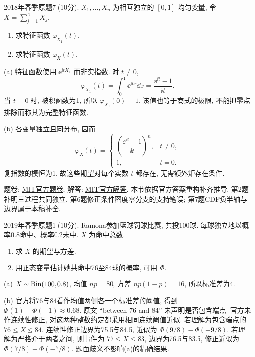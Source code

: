 \begin{exercise}\label{m2:2018s:q7}
2018年春季原题7 (10分). $X_1,\ldots,X_n$ 为相互独立的 $[0,1]$ 均匀变量, 令 $X=\sum_{j=1}^nX_j$.
\begin{enumerate}
\item[(a)]\label{m2:2018s:q7:a} 求特征函数 $\varphi_{X_1}(t)$.
\item[(b)]\label{m2:2018s:q7:b} 求特征函数 $\varphi_X(t)$.
\end{enumerate}
\end{exercise}
\begin{solution}
(a) 特征函数使用 $\ee^{\ii tX_1}$ 而非实指数. 对 $t\ne0$,
\[
\varphi_{X_1}(t)=\int_0^1\ee^{\ii tx}\dd x=\frac{\ee^{\ii t}-1}{\ii t}.
\]
当 $t=0$ 时, 被积函数为1, 所以 $\varphi_{X_1}(0)=1$. 该值也等于商式的极限, 不能把零点排除而称其为完整特征函数.

(b) 各变量独立且同分布, 因而
\[
\varphi_X(t)=\begin{cases}\left(\dfrac{\ee^{\ii t}-1}{\ii t}\right)^n,&t\ne0,\\1,&t=0.\end{cases}
\]
复指数的模恒为1, 故这些期望对每个实数 $t$ 都存在, 无需额外矩存在条件.
\end{solution}

题卷: \href{https://ocw.mit.edu/courses/18-600-probability-and-random-variables-fall-2019/resources/mit18_600f19_mid2_2019/}{MIT官方题卷}; 解答: \href{https://ocw.mit.edu/courses/18-600-probability-and-random-variables-fall-2019/resources/mit18_600f19_mid2_2019_soln/}{MIT官方解答}. 本节依据官方答案重构补齐推导. 第2题补明三过程共同独立, 第6题修正条件密度零分支的支持笔误; 第7题CDF负半轴与边界属于本稿补全.

\begin{exercise}\label{m2:2019s:q1}
2019年春季原题1 (10分). Ramona参加篮球罚球比赛, 共投100球. 每球独立地以概率0.8命中、概率0.2未中. $X$ 为命中总数.
\begin{enumerate}
\item[(a)]\label{m2:2019s:q1:a} 求 $X$ 的期望与方差.
\item[(b)]\label{m2:2019s:q1:b} 用正态变量估计她共命中76至84球的概率, 可用 $\Phi$.
\end{enumerate}
\end{exercise}
\begin{solution}
(a) $X\sim\operatorname{Bin}(100,0.8)$, 均值 $np=80$, 方差 $np(1-p)=16$, 所以标准差为4.

(b) 官方将76与84看作均值两侧各一个标准差的阈值, 得到 $\Phi(1)-\Phi(-1)\approx0.68$. 原文 ``between 76 and 84'' 未声明是否包含端点; 官方未作连续性修正, 对这两种整数约定都采用相同连续阈值近似. 若理解为包含端点的 $76\le X\le84$, 连续性修正边界为75.5与84.5, 近似为 $\Phi(9/8)-\Phi(-9/8)$. 若理解为严格介于两者之间, 则事件为 $77\le X\le83$, 边界为76.5与83.5, 修正近似为 $\Phi(7/8)-\Phi(-7/8)$. 题面歧义不影响(a)的精确结果.
\end{solution}

